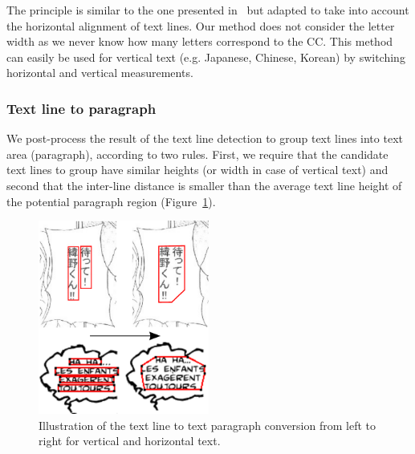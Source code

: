  The principle is similar to the one presented in~\cite{Clavelli09} but adapted to take into account the horizontal alignment of text lines.
 Our method does not consider the letter width as we never know how many letters correspond to the CC.
 This method can easily be used for vertical text (e.g. Japanese, Chinese, Korean) by switching horizontal and vertical measurements.







\subsubsection{Text line to paragraph} %
\label{par:text_line_grouping}

We post-process the result of the text line detection to group text lines into text area (paragraph), according to two rules.
First, we require that the candidate text lines to group have similar heights (or width in case of vertical text) and second that the inter-line distance is smaller than the average text line height of the potential paragraph region (Figure~\ref{fig:se:line_to_paragraphs}).

	\begin{figure}[h!]	%
	  \centering
		\includegraphics[trim= 0px 0px 0px 0px, clip, width=0.5\textwidth]{line_to_paragraphs.pdf}
		\caption[Text line to text paragraph conversion illustration]{Illustration of the text line to text paragraph conversion from left to right for vertical and horizontal text.}
		\label{fig:se:line_to_paragraphs}
	\end{figure}

